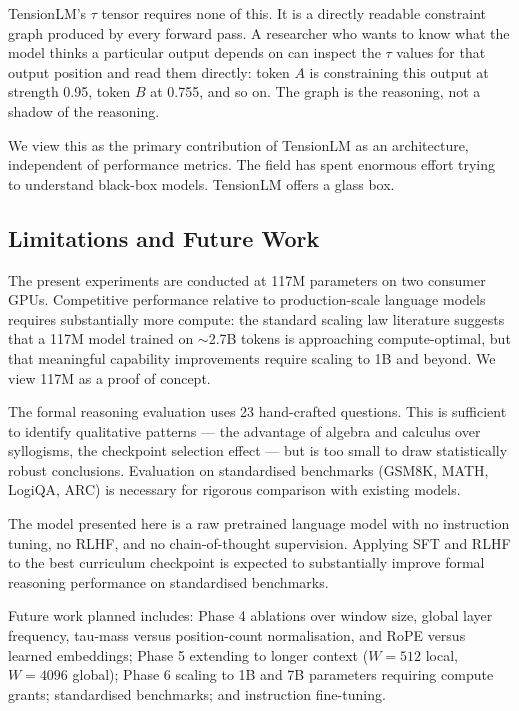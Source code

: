 \documentclass[10pt,a4paper]{article}
\begin{document}
TensionLM's $\tau$ tensor requires none of this. It is a directly readable constraint graph produced by every forward pass. A researcher who wants to know what the model thinks a particular output depends on can inspect the $\tau$ values for that output position and read them directly: token $A$ is constraining this output at strength 0.95, token $B$ at 0.755, and so on. The graph is the reasoning, not a shadow of the reasoning.

We view this as the primary contribution of TensionLM as an architecture, independent of performance metrics. The field has spent enormous effort trying to understand black-box models. TensionLM offers a glass box.

\subsection{Limitations and Future Work}

The present experiments are conducted at 117M parameters on two consumer GPUs. Competitive performance relative to production-scale language models requires substantially more compute: the standard scaling law literature \cite{hoffmann2022training} suggests that a 117M model trained on $\sim$2.7B tokens is approaching compute-optimal, but that meaningful capability improvements require scaling to 1B and beyond. We view 117M as a proof of concept.

The formal reasoning evaluation uses 23 hand-crafted questions. This is sufficient to identify qualitative patterns --- the advantage of algebra and calculus over syllogisms, the checkpoint selection effect --- but is too small to draw statistically robust conclusions. Evaluation on standardised benchmarks (GSM8K, MATH, LogiQA, ARC) is necessary for rigorous comparison with existing models.

The model presented here is a raw pretrained language model with no instruction tuning, no RLHF, and no chain-of-thought supervision. Applying SFT and RLHF to the best curriculum checkpoint is expected to substantially improve formal reasoning performance on standardised benchmarks.

Future work planned includes: Phase 4 ablations over window size, global layer frequency, tau-mass versus position-count normalisation, and RoPE versus learned embeddings; Phase 5 extending to longer context ($W = 512$ local, $W = 4096$ global); Phase 6 scaling to 1B and 7B parameters requiring compute grants; standardised benchmarks; and instruction fine-tuning.
\end{document}

